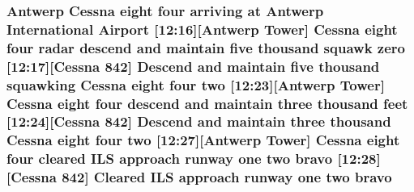 \subsubsection[{\texorpdfstring{bravo}{bravo}}]{\setlength{\rightskip}{0pt plus 5cm}Antwerp {\bf Cessna} eight four arriving at Antwerp International {\bf Airport} \mbox{[}12\+:16\mbox{]}\mbox{[}Antwerp {\bf Tower}\mbox{]} {\bf Cessna} eight four radar descend and maintain five {\bf thousand} squawk {\bf zero} \mbox{[}12\+:17\mbox{]}\mbox{[}{\bf Cessna} 842\mbox{]} Descend and maintain five {\bf thousand} {\bf squawking} {\bf Cessna} eight four {\bf two} \mbox{[}12\+:23\mbox{]}\mbox{[}Antwerp {\bf Tower}\mbox{]} {\bf Cessna} eight four descend and maintain three {\bf thousand} {\bf feet} \mbox{[}12\+:24\mbox{]}\mbox{[}{\bf Cessna} 842\mbox{]} Descend and maintain three {\bf thousand} {\bf Cessna} eight four {\bf two} \mbox{[}12\+:27\mbox{]}\mbox{[}Antwerp {\bf Tower}\mbox{]} {\bf Cessna} eight four cleared I\+LS approach runway {\bf one} {\bf two} bravo \mbox{[}12\+:28\mbox{]}\mbox{[}{\bf Cessna} 842\mbox{]} Cleared I\+LS approach runway {\bf one} {\bf two} bravo}\hypertarget{happyDay3ATC_8txt_a08d7b5c980380fb31f4a08ee2e35e432}{}\label{happyDay3ATC_8txt_a08d7b5c980380fb31f4a08ee2e35e432}
